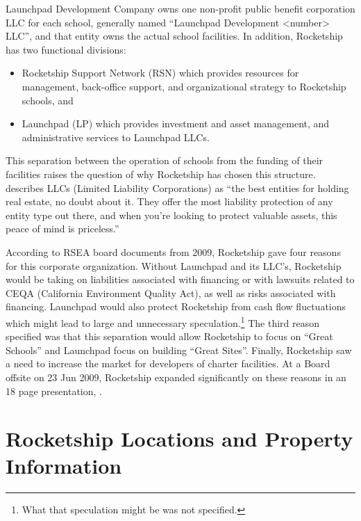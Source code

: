 Launchpad Development Company owns one non-profit public benefit corporation LLC for each school, generally named ``Launchpad Development <number> LLC'', and that entity owns the actual school facilities. In addition, Rocketship has two functional divisions:
\begin{itemize}
  \item Rocketship Support Network (RSN) which provides resources for management, back-office support, and organizational strategy to Rocketship schools, and
  \item Launchpad (LP) which provides investment and asset management, and administrative services to Launchpad LLCs.
\end{itemize}

This separation between the operation of schools from the funding of their facilities raises the question of why Rocketship has chosen this structure. \citeauthor{Reuting2023} describes LLCs (Limited Liability Corporations) as ``the best entities for holding real estate, no doubt about it. They offer the most liability protection of any entity type out there, and when you're looking to protect valuable assets, this peace of mind is priceless.'' \parencite[292]{Reuting2023}

According to RSEA board documents from 2009, Rocketship gave four reasons for this corporate organization. Without Launchpad and its LLC's, Rocketship would be taking on liabilities associated with financing or with lawsuits related to CEQA (California Environment Quality Act), as well as risks associated with financing. Launchpad would also protect Rocketship from cash flow fluctuations which might lead to large and unnecessary speculation.\footnote{What that speculation might be was not specified.} The third reason specified was that this separation would allow Rocketship to focus on ``Great Schools'' and Launchpad focus on building ``Great Sites''. Finally, Rocketship saw a need to increase the market for developers of charter facilities. At a Board offsite on 23 Jun 2009, Rocketship expanded significantly on these reasons in an 18 page presentation, \textcite{RSED2009}.

\section{Rocketship Locations and Property Information}
\label{sec:location-and-property-info}\indent%


